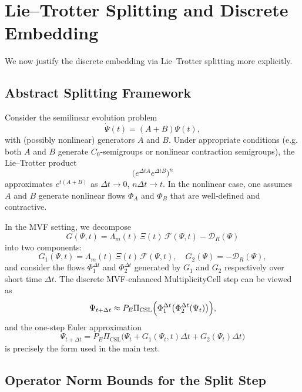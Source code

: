 \documentclass[11pt]{article}
\begin{document}
\section{Lie--Trotter Splitting and Discrete Embedding}

We now justify the discrete embedding via Lie--Trotter splitting more explicitly.

\subsection{Abstract Splitting Framework}

Consider the semilinear evolution problem
\[
  \dot{\Psi}(t) = (A+B)\Psi(t),
\]
with (possibly nonlinear) generators $A$ and $B$. Under appropriate conditions (e.g. both $A$ and $B$ generate $C_0$-semigroups or nonlinear contraction semigroups), the Lie--Trotter product
\[
  \bigl(e^{\Delta t A} e^{\Delta t B}\bigr)^n
\]
approximates $e^{t(A+B)}$ as $\Delta t\to 0$, $n\Delta t\to t$. In the nonlinear case, one assumes $A$ and $B$ generate nonlinear flows $\Phi_A$ and $\Phi_B$ that are well-defined and contractive.

In the MVF setting, we decompose
\[
  G(\Psi,t) = \Lambda_m(t)\,\Xi(t)\,\mathcal{F}(\Psi,t) - \mathcal{D}_R(\Psi)
\]
into two components:
\[
  G_1(\Psi,t) = \Lambda_m(t)\,\Xi(t)\,\mathcal{F}(\Psi,t),
  \quad
  G_2(\Psi) = -\mathcal{D}_R(\Psi),
\]
and consider the flows $\Phi_1^{\Delta t}$ and $\Phi_2^{\Delta t}$ generated by $G_1$ and $G_2$ respectively over short time $\Delta t$. The discrete MVF-enhanced MultiplicityCell step can be viewed as
\[
  \Psi_{t+\Delta t}
  \approx
  P_E \Pi_{\mathrm{CSL}}
  \Bigl(
    \Phi_1^{\Delta t}\bigl(
      \Phi_2^{\Delta t}(\Psi_t)
    \bigr)
  \Bigr),
\]
and the one-step Euler approximation
\[
  \Psi_{t+\Delta t}
  =
  P_E \Pi_{\mathrm{CSL}}
  \bigl(
    \Psi_t
    + G_1(\Psi_t,t)\Delta t
    + G_2(\Psi_t)\Delta t
  \bigr)
\]
is precisely the form used in the main text.

\subsection{Operator Norm Bounds for the Split Step}
\end{document}
